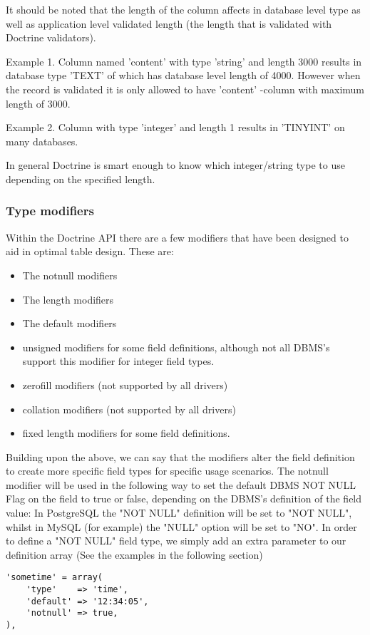 \documentclass[11pt,a4paper]{report}
\begin{document}
It should be noted that the length of the column affects in database level type as well as application level validated length (the length that is validated with Doctrine validators).

Example 1. Column named 'content' with type 'string' and length 3000 results in database type 'TEXT' of which has database level length of 4000. However when the record is validated it is only allowed to have 'content' -column with maximum length of 3000.

Example 2. Column with type 'integer' and length 1 results in 'TINYINT' on many databases.

In general Doctrine is smart enough to know which integer/string type to use depending on the specified length.

\subsubsection{Type modifiers}
Within the Doctrine API there are a few modifiers that have been designed to aid in optimal table design. These are:

\begin{itemize}
\item{The notnull modifiers}
\item{The length modifiers}
\item{The default modifiers}
\item{unsigned modifiers for some field definitions, although not all DBMS's support this modifier for integer field types.}
\item{zerofill modifiers (not supported by all drivers)}
\item{collation modifiers (not supported by all drivers)}
\item{fixed length modifiers for some field definitions.}
\end{itemize}
Building upon the above, we can say that the modifiers alter the field definition to create more specific field types for specific usage scenarios. The notnull modifier will be used in the following way to set the default DBMS NOT NULL Flag on the field to true or false, depending on the DBMS's definition of the field value: In PostgreSQL the "NOT NULL" definition will be set to "NOT NULL", whilst in MySQL (for example) the "NULL" option will be set to "NO". In order to define a "NOT NULL" field type, we simply add an extra parameter to our definition array (See the examples in the following section)

\begin{verbatim}
'sometime' = array(
    'type'    => 'time',
    'default' => '12:34:05',
    'notnull' => true,
),
\end{verbatim}
\end{document}
